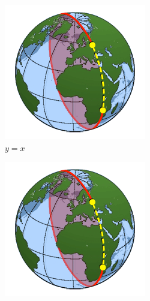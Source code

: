 \documentclass[12pt,letterpaper,oneside]{article}
\begin{document}
\begin{figure}
     \centering
     \begin{subfigure}[b]{0.3\textwidth}
         \centering
         \includegraphics[width=\textwidth]{haversine.png}
         \caption{$y=x$}
         \label{fig:y equals x}
     \end{subfigure}
     \hfill
     \begin{subfigure}[b]{0.3\textwidth}
         \centering
         \includegraphics[width=\textwidth]{haversine.png}

\end{subfigure}
\end{figure}
\end{document}
